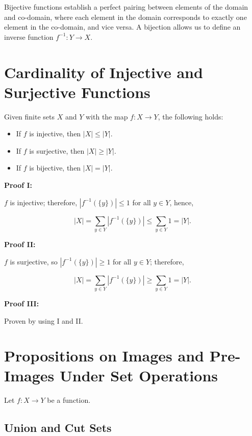 Bijective functions establish a perfect pairing between elements of the domain and co-domain, where each
element in the domain corresponds to exactly one element in the co-domain, and vice versa. A bijection
allows us to define an inverse function \(f^{-1}: Y \to X\).

\section{Cardinality of Injective and Surjective Functions}

Given finite sets \(X\) and \(Y\) with the map \(f: X \to Y\), the following holds:

\begin{itemize}

	\item If \(f\) is injective, then \(|X| \le |Y|\).

	\item If \(f\) is surjective, then \(|X| \ge |Y|\).

	\item If \(f\) is bijective, then \(|X| = |Y|\).

\end{itemize}

\textbf{Proof I:}

\(f\) is injective; therefore, \(|f^{-1}(\{y\})| \le 1\) for all \(y \in Y\), hence,

\[
	|X| = \sum_{y \in Y} |f^{-1}(\{y\})| \le \sum_{y \in Y} 1 = |Y|.
\]

\QED

\textbf{Proof II:}

\(f\) is surjective, so \(|f^{-1}(\{y\})| \ge 1\) for all \(y \in Y\); therefore,

\[
	|X| = \sum_{y \in Y} |f^{-1}(\{y\})| \ge \sum_{y \in Y} 1 = |Y|.
\]

\QED

\textbf{Proof III:}

Proven by using I and II.

\QED

\section{Propositions on Images and Pre-Images Under Set Operations}

Let \( f : X \to Y \) be a function.

\subsection{Union and Cut Sets}

